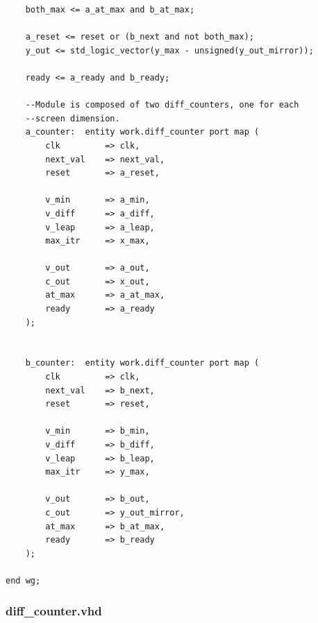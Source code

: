 \documentclass{article}
\begin{document}
\begin{lstlisting}
	both_max <= a_at_max and b_at_max;
	
	a_reset <= reset or (b_next and not both_max); 
	y_out <= std_logic_vector(y_max - unsigned(y_out_mirror));
	
	ready <= a_ready and b_ready;

	--Module is composed of two diff_counters, one for each
	--screen dimension.
	a_counter:	entity work.diff_counter port map (
		clk 		=> clk,
		next_val 	=> next_val,
		reset 		=> a_reset,		
		
		v_min 		=> a_min,
		v_diff		=> a_diff,
		v_leap		=> a_leap,
		max_itr		=> x_max,
		
		v_out		=> a_out,
		c_out		=> x_out,
		at_max		=> a_at_max,
		ready		=> a_ready
	);
	
	
	b_counter:	entity work.diff_counter port map (
		clk 		=> clk,
		next_val 	=> b_next,
		reset 		=> reset,		
		
		v_min 		=> b_min,
		v_diff		=> b_diff,
		v_leap		=> b_leap,
		max_itr		=> y_max,
		
		v_out		=> b_out,
		c_out		=> y_out_mirror,
		at_max		=> b_at_max,
		ready		=> b_ready
	);	

end wg;
\end{lstlisting}

\subsubsection{diff\_counter.vhd}					%
\end{document}
